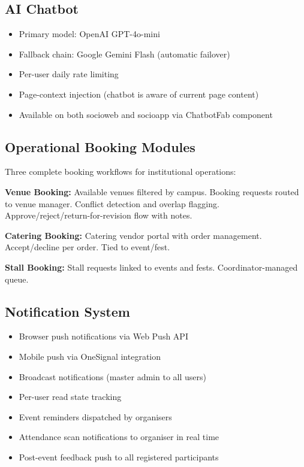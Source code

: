 \documentclass[12pt,a4paper]{article}
\begin{document}
\subsection{AI Chatbot}

\begin{itemize}[leftmargin=*]
    \item Primary model: OpenAI GPT-4o-mini
    \item Fallback chain: Google Gemini Flash (automatic failover)
    \item Per-user daily rate limiting
    \item Page-context injection (chatbot is aware of current page content)
    \item Available on both socioweb and socioapp via ChatbotFab component
\end{itemize}

\subsection{Operational Booking Modules}

Three complete booking workflows for institutional operations:

\textbf{Venue Booking:}
Available venues filtered by campus. Booking requests routed to venue manager. Conflict detection and overlap flagging. Approve/reject/return-for-revision flow with notes.

\textbf{Catering Booking:}
Catering vendor portal with order management. Accept/decline per order. Tied to event/fest.

\textbf{Stall Booking:}
Stall requests linked to events and fests. Coordinator-managed queue.

\subsection{Notification System}

\begin{itemize}[leftmargin=*]
    \item Browser push notifications via Web Push API
    \item Mobile push via OneSignal integration
    \item Broadcast notifications (master admin to all users)
    \item Per-user read state tracking
    \item Event reminders dispatched by organisers
    \item Attendance scan notifications to organiser in real time
    \item Post-event feedback push to all registered participants
\end{itemize}
\end{document}
